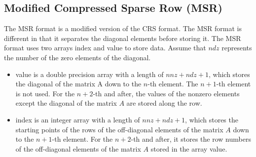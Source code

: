 \documentclass[a4paper]{article}
\begin{document}
\newpage
\subsection{Modified Compressed Sparse Row (MSR)}
The MSR format is a modified version of the CRS format. 
The MSR format is different in that it separates the diagonal elements before storing it. 
The MSR format uses two arrays {\ttfamily index} and {\ttfamily value} to store data. 
Assume that $ndz$ represents the number of the zero elements of the diagonal.
\begin{itemize}
\item {\ttfamily value} is a double precision array with a length of
      $nnz+ndz+1$, which stores the diagonal of the matrix A down to the
      $n$-th element. The $n+1$-th element is not used. For the $n+2$-th
      and after, the values of the nonzero elements except the diagonal of the matrix $A$ are stored along the row.
\item {\ttfamily index} is an integer array with a length of
      $nnz+ndz+1$, 
      which stores the starting points of the rows of the off-diagonal
      elements of the matrix $A$ down to the $n+1$-th element. For the
      $n+2$-th and after, 
      it stores the row numbers of the off-diagonal elements of
      the matrix $A$ stored in the array {\ttfamily value}.
\end{itemize}
\end{document}
